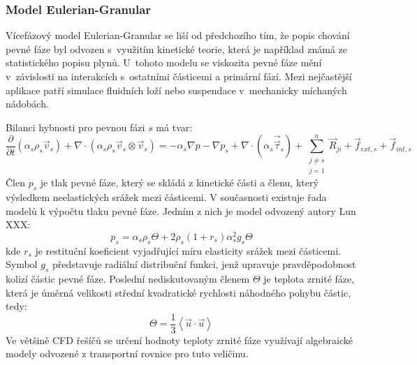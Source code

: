 \subsubsection{Model Eulerian-Granular}
\label{sec:egm}
Vícefázový model Eulerian-Granular se liší od předchozího tím, že  popis chování pevné fáze byl odvozen s~využitím kinetické teorie, která je například známá ze statistického popisu plynů. U~tohoto modelu se viskozita pevné fáze mění v~závislosti na interakcích s~ostatními částicemi a primární fází. Mezi nejčastější aplikace patří simulace fluidních loží nebo suspendace v~mechanicky míchaných nádobách.

Bilanci hybnosti pro pevnou fázi $s$ má tvar:
\begin{equation}
	\frac{\partial}{\partial t} \left(\alpha_{s}\rho_{s}\vec{v}_{s}\right) + \nabla \cdot (\alpha_{s}\rho_{s} \vec{v}_{s} \otimes \vec{v}_{s}) = -\alpha_{s} \nabla p - \nabla p_{s} + \nabla \cdot \left(\alpha_{s} \vec{\vec{\tau}}_{s} \right) +\sum_{\substack{ j \neq s \\ j=1}}^{n} \vec{R}_{ji} + \vec{f}_{ext,s} + \vec{f}_{int,s}
	\label{eq:moms}
\end{equation}
Člen $p_{s}$ je tlak pevné fáze, který se skládá z kinetické části a členu, který výsledkem neelastických srážek mezi částicemi. V současnosti existuje řada modelů k výpočtu tlaku pevné fáze. Jedním z nich je model odvozený autory Lun XXX:
\begin{equation}
	p_{s} = \alpha_{s}\rho_{s}\Theta + 2\rho_{s}\left(1 + r_{s} \right) \alpha_{s}^{2}g_{s}\Theta
	\label{eq:ps}
\end{equation}
kde $r_{s}$ je restituční koeficient vyjadřující míru elasticity srážek mezi částicemi. Symbol $g_{s}$ představuje radiální distribuční funkci, jenž upravuje pravděpodobnost kolizí částic pevné fáze. Poslední nediskutovaným členem $\Theta$ je teplota zrnité fáze, která je úměrná velikosti střední kvadratické rychlosti náhodného pohybu částic, tedy: 
\begin{equation}
	\Theta = \frac{1}{3}\left< \vec{u} \cdot \vec{u} \right>
	\label{eq:gtemp}
\end{equation}
Ve většině CFD řešíčů se určení hodnoty teploty zrnité fáze využívají algebraické modely odvozené z transportní rovnice pro tuto veličinu.

